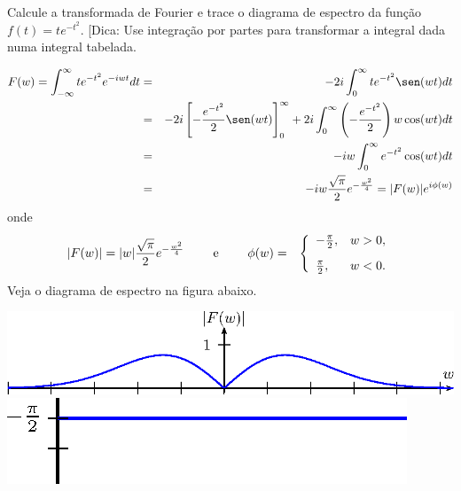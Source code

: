 \begin{exer}{\label{exer_te_t2}} Calcule a transformada de Fourier e trace o diagrama de espectro da função $f(t)=te^{-t^2}$. [Dica: Use integração por partes para transformar a integral dada numa integral tabelada.
\end{exer}
\begin{resp}
\begin{eqnarray*}
F(w)=\int_{-\infty}^\infty te^{-t^2}e^{-iwt}dt&=&-2i\int_{0}^\infty te^{-t^2}\sen(wt)dt\\
&=&-2i\left[-\frac{e^{-t^2}}{2}\sen(wt) \right]_0^\infty+2i\int_{0}^\infty \left(-\frac{e^{-t^2}}{2}\right)w\cos(wt)dt\\
&=&-iw\int_{0}^\infty e^{-t^2}\cos(wt)dt\\
&=&-iw\frac{\sqrt{\pi}}{2}e^{-\frac{w^2}{4}}=|F(w)|e^{i\phi(w)}
\end{eqnarray*}
onde
\begin{eqnarray*}
|F(w)|=|w|\frac{\sqrt{\pi}}{2}e^{-\frac{w^2}{4}}\qquad\hbox{ e }\qquad \phi(w)&=&\left\{\begin{array}{ll}
-\frac{\pi}{2},&w>0,\\[.3cm]
\frac{\pi}{2},&w<0.
\end{array}\right.
\end{eqnarray*}
Veja o diagrama de espectro na figura abaixo.
\begin{center}
\includegraphics{cap_diagramas_espectro_transformada/pics/figura_4}
\includegraphics{cap_diagramas_espectro_transformada/pics/figura_5}\end{center}
\end{resp}
